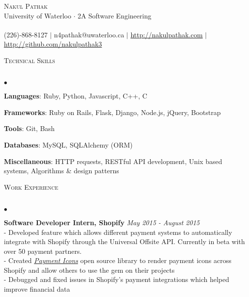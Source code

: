 \documentclass[10pt]{article}
\newcommand{\lineunder}{\vspace*{-8pt} \\ \hspace*{-18pt} \hrulefill \\}
\newcommand{\header}[1]{{\hspace*{-15pt}\vspace*{6pt} \textsc{#1}} \vspace*{-6pt} \lineunder}
\newenvironment{achievements}{\begin{list}{$\bullet$}{\topsep 0pt \itemsep -1.5pt \leftmargin 5pt}}{\vspace*{4pt}\end{list}}
\begin{document}
\small
\smallskip
\vspace*{-45pt}

\begin{center}
	{\Huge \scshape {Nakul Pathak}} \\
\vspace*{6pt} 
{\fontsize{10}{1}\selectfont University of Waterloo $\cdot$ 2A Software Engineering} \\
\vspace{-4pt}
\hspace*{-18pt} \hrulefill \\
\vspace{2pt}
\hspace*{-18pt} (226)-868-8127 $|$ n4pathak@uwaterloo.ca $|$ \url{http://nakulpathak.com} $|$  \url{http://github.com/nakulpathak3}
\vspace{-5pt}
\end{center}

\header{\normalsize Technical Skills}
\begin{achievements}
\item \textbf{Languages}: Ruby, Python, Javascript, C++, C
\item \textbf{Frameworks}: Ruby on Rails, Flask, Django, Node.js, jQuery, Bootstrap
\item \textbf{Tools}: Git, Bash
\item \textbf{Databases}: MySQL,  SQLAlchemy (ORM)
\item \textbf{Miscellaneous}: HTTP requests, RESTful API development, Unix based systems, Algorithms \& design patterns
\end{achievements}

\vspace{6pt}

\header{\normalsize Work Experience}
\begin{achievements}
\item \textbf{Software Developer Intern, Shopify} \hfill \textit {May 2015 - August 2015}
\\ - Developed feature which allows different payment systems to automatically integrate with Shopify through the Universal Offsite API. Currently in beta with over 50 payment partners.
\\ -  Created \textit{\href{https://github.com/activemerchant/payment_icons}{Payment Icons}} open source library to render payment icons across Shopify and allow others to use the gem on their projects
\\ -  Debugged and fixed issues in Shopify's payment integrations which helped improve financial data 
\end{achievements}
\end{document}
